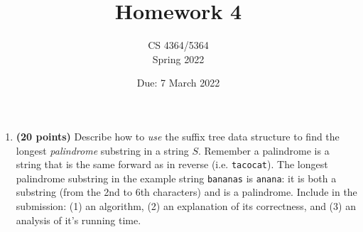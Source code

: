 \documentclass[11pt, oneside]{article}   	%
\title{Homework 4}
\author{CS 4364/5364\\Spring 2022}
\date{Due: 7 March 2022}							%
\begin{document}
\maketitle


\begin{enumerate}
\item \textbf{(20 points)} 
Describe how to \emph{use} the suffix tree data structure to find the longest \textit{palindrome} substring in a string $S$. 
Remember a palindrome is a string that is the same forward as in reverse (i.e. \texttt{tacocat}). 
The longest palindrome substring in the example string \texttt{bananas} is \texttt{anana}:
it is both a substring (from the 2nd to 6th characters) and is a palindrome. 
Include in the submission: (1) an algorithm, (2) an explanation of its correctness, and (3) an analysis of it's running time.


\end{enumerate}
\end{document}
